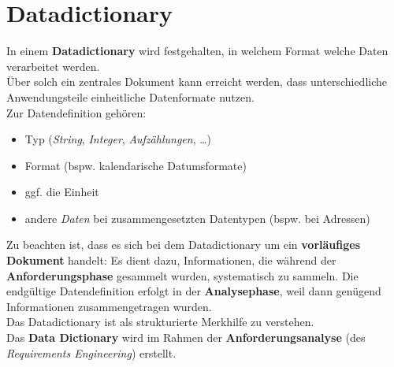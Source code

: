 \section{Datadictionary}

\begin{tcolorbox}[title=Datadictionary]
    In einem \textbf{Datadictionary} wird festgehalten, in welchem Format welche Daten verarbeitet werden.\\
    Über solch ein zentrales Dokument kann erreicht werden, dass unterschiedliche Anwendungsteile einheitliche Datenformate nutzen.\\

    \noindent
    Zur Datendefinition gehören:
    \begin{itemize}
        \item Typ (\textit{String}, \textit{Integer}, \textit{Aufzählungen}, \ldots)
        \item Format (bspw. kalendarische Datumsformate)
        \item ggf. die Einheit
        \item andere \textit{Daten} bei zusammengesetzten Datentypen (bspw. bei Adressen)
    \end{itemize}

    \noindent
    Zu beachten ist, dass es sich bei dem Datadictionary um ein \textbf{vorläufiges Dokument} handelt: Es dient dazu, Informationen, die während der \textbf{Anforderungsphase} gesammelt wurden, systematisch zu sammeln.
    Die endgültige Datendefinition erfolgt in der \textbf{Analysephase}, weil dann genügend Informationen zusammengetragen wurden.    \\
    Das Datadictionary ist als strukturierte Merkhilfe zu verstehen.\\

    \noindent
    Das \textbf{Data Dictionary} wird im Rahmen der \textbf{Anforderungsanalyse} (des \textit{Requirements Engineering}) erstellt.
\end{tcolorbox}
